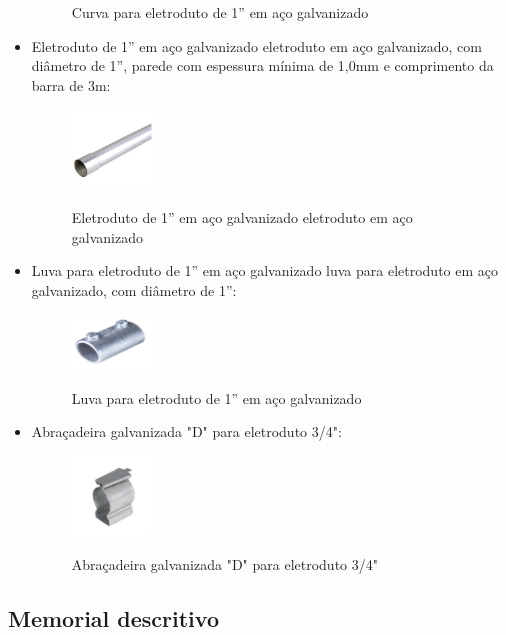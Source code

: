 \documentclass[	DIV=calc,%
							paper=a4,%
							fontsize=12pt,%
							onecolumn]{scrartcl}	 					%
\begin{document}
\begin{itemize}
\begin{figure}[h!]
	\label{figura18}
	\caption{Curva para eletroduto de 1” em aço galvanizado}
\end{figure}
\newpage
\item Eletroduto de 1” em aço galvanizado eletroduto em aço galvanizado, com diâmetro de 1”, parede com espessura mínima de 1,0mm e comprimento da barra de 3m:
\begin{figure}[h!]
	\centering
	\includegraphics[width=0.2\textwidth]{figura19.jpg}
	\label{figura19}
	\caption{Eletroduto de 1” em aço galvanizado eletroduto em aço galvanizado}
\end{figure}
\item Luva para eletroduto de 1” em aço galvanizado luva para eletroduto em aço galvanizado, com diâmetro de 1”:
\begin{figure}[h!]
	\centering
	\includegraphics[width=0.2\textwidth]{figura20.jpg}
	\label{figura20}
	\caption{Luva para eletroduto de 1” em aço galvanizado}
\end{figure}
\item Abraçadeira galvanizada "D" para eletroduto 3/4":
\begin{figure}[h!]
	\centering
	\includegraphics[width=0.2\textwidth]{figura21.jpg}
	\label{figura21}
	\caption{Abraçadeira galvanizada "D" para eletroduto 3/4"}
\end{figure}
\end{itemize}
\newpage
\subsection{Memorial descritivo}

\end{document}

